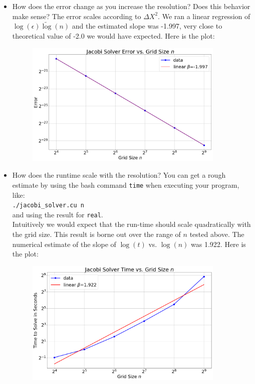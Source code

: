 \documentclass[11pt]{article}
\begin{document}
    \begin{itemize}
      \item How does the error change as you increase the resolution? Does this behavior make sense?
The error scales according to $\Delta X^2$.  
We ran a linear regression of $\log(\epsilon) \tilde \log(n)$
and the estimated slope was -1.997, very close to theoretical value of -2.0 we would have expected.
Here is the plot:
\begin{center}
\begin{figure}
\includegraphics[width=0.90\textwidth]{jacobi_error.png}
\end{figure}
\end{center}

      \item How does the runtime scale with the resolution? You can get a rough estimate by using the bash command \texttt{time} when executing your program, like:
    \vspace{3mm}\\ \texttt{./jacobi\_solver.cu n} \vspace{3mm}\\ and using the result for \texttt{real}. \\
Intuitively we would expect that the run-time should scale quadratically with the grid size.
This result is borne out over the range of $n$ tested above.  
The numerical estimate of the slope of $\log(t)$ vs. $\log(n)$ was 1.922.
Here is the plot:
\begin{center}
\begin{figure}
\includegraphics[width=0.90\textwidth]{jacobi_time.png}
\end{figure}
\end{center}



\end{itemize}
\end{document}

